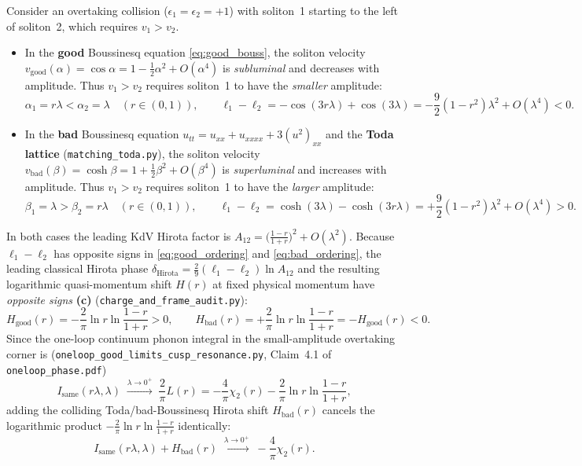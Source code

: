\documentclass[11pt,a4paper]{article}
\begin{document}
Consider an overtaking collision ($\epsilon_1 = \epsilon_2 = +1$) with soliton~1
starting to the left of soliton~2, which requires $v_1 > v_2$.
\begin{itemize}
\item In the \textbf{good} Boussinesq equation \eqref{eq:good_bouss}, the soliton
velocity $v_{\mathrm{good}}(\alpha) = \cos\alpha = 1 - \frac{1}{2}\alpha^2 + O(\alpha^4)$
 is \emph{subluminal} and decreases with amplitude. Thus $v_1 > v_2$ requires
soliton~1 to have the \emph{smaller} amplitude:
\begin{equation}
  \alpha_1 = r\lambda < \alpha_2 = \lambda \quad (r \in (0,1)), \qquad
  \ell_1 - \ell_2 = -\cos(3r\lambda) + \cos(3\lambda) = -\frac{9}{2}(1-r^2)\lambda^2 + O(\lambda^4) < 0.
  \label{eq:good_ordering}
\end{equation}
\item In the \textbf{bad} Boussinesq equation $u_{tt} = u_{xx} + u_{xxxx} + 3(u^2)_{xx}$
and the \textbf{Toda lattice} (\texttt{matching\_toda.py}), the soliton velocity
$v_{\mathrm{bad}}(\beta) = \cosh\beta = 1 + \frac{1}{2}\beta^2 + O(\beta^4)$ is
\emph{superluminal} and increases with amplitude. Thus $v_1 > v_2$ requires
soliton~1 to have the \emph{larger} amplitude:
\begin{equation}
  \beta_1 = \lambda > \beta_2 = r\lambda \quad (r \in (0,1)), \qquad
  \ell_1 - \ell_2 = \cosh(3\lambda) - \cosh(3r\lambda) = +\frac{9}{2}(1-r^2)\lambda^2 + O(\lambda^4) > 0.
  \label{eq:bad_ordering}
\end{equation}
\end{itemize}
In both cases the leading KdV Hirota factor is $A_{12} = \big(\frac{1-r}{1+r}\big)^2 + O(\lambda^2)$.
Because $\ell_1 - \ell_2$ has opposite signs in \eqref{eq:good_ordering} and
\eqref{eq:bad_ordering}, the leading classical Hirota phase
$\delta_{\mathrm{Hirota}} = \frac{2}{9}(\ell_1-\ell_2)\ln A_{12}$ and the
resulting logarithmic quasi-momentum shift $H(r)$ at fixed physical momentum have
\emph{opposite signs} \textbf{(c)} (\texttt{charge\_and\_frame\_audit.py}):
\begin{equation}
  H_{\mathrm{good}}(r) = -\frac{2}{\pi}\ln r\ln\frac{1-r}{1+r} > 0, \qquad
  H_{\mathrm{bad}}(r) = +\frac{2}{\pi}\ln r\ln\frac{1-r}{1+r} = -H_{\mathrm{good}}(r) < 0.
  \label{eq:H_good_vs_bad}
\end{equation}
Since the one-loop continuum phonon integral in the small-amplitude overtaking
corner is (\texttt{oneloop\_good\_limits\_cusp\_resonance.py}, Claim~4.1 of
\texttt{oneloop\_phase.pdf})
\begin{equation}
  I_{\mathrm{same}}(r\lambda,\lambda)
  \;\xrightarrow{\lambda\to 0^+}\;
  \frac{2}{\pi}L(r)
  = -\frac{4}{\pi}\chi_2(r) - \frac{2}{\pi}\ln r\ln\frac{1-r}{1+r},
  \label{eq:I_same_kdv}
\end{equation}
adding the colliding Toda/bad-Boussinesq Hirota shift $H_{\mathrm{bad}}(r)$
cancels the logarithmic product $-\frac{2}{\pi}\ln r\ln\frac{1-r}{1+r}$
identically:
\begin{equation}
  I_{\mathrm{same}}(r\lambda,\lambda) + H_{\mathrm{bad}}(r)
  \;\xrightarrow{\lambda\to 0^+}\;
  -\frac{4}{\pi}\chi_2(r).
  \label{eq:I_plus_Hbad}
\end{equation}
\end{document}
